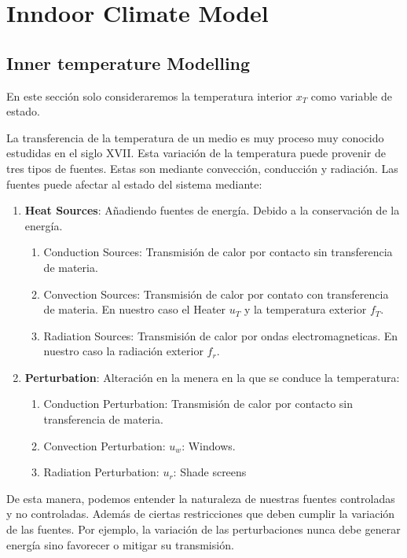 
    \chapter{Inndoor Climate Model}


    
    \section{Inner temperature Modelling}

    En este sección solo consideraremos la temperatura interior $x_{T}$ como variable de estado.
    
    La transferencia de la temperatura de un medio es muy proceso muy conocido estudidas en el siglo XVII. Esta variación de la temperatura puede provenir de tres tipos de fuentes. Estas son mediante convección, conducción y radiación. Las fuentes puede afectar al estado del sistema mediante:
    \begin{enumerate}
        \item \textbf{Heat Sources}: Añadiendo fuentes de energía. Debido a la conservación de la energía.
        \begin{enumerate}
            \item Conduction Sources: Transmisión de calor por contacto sin transferencia de materia.
            \item Convection Sources: Transmisión de calor por contato con transferencia de materia. En nuestro caso el Heater $u_T$ y la temperatura exterior $f_T$.
            \item Radiation Sources: Transmisión de calor por ondas electromagneticas. En nuestro caso la radiación exterior $f_r$. 
        \end{enumerate}
        \item \textbf{Perturbation}: Alteración en la menera en la que se conduce la temperatura:
        \begin{enumerate}
            \item Conduction Perturbation: Transmisión de calor por contacto sin transferencia de materia.
            \item Convection Perturbation: $u_w$: Windows.
            \item Radiation Perturbation:  $u_r$:             Shade screens
        \end{enumerate}
    \end{enumerate}
    De esta manera, podemos entender la naturaleza de nuestras fuentes controladas y no controladas. Además de ciertas restricciones que deben cumplir la variación de las fuentes. Por ejemplo, la variación de las perturbaciones nunca debe generar energía sino favorecer o mitigar su transmisión. 
    
